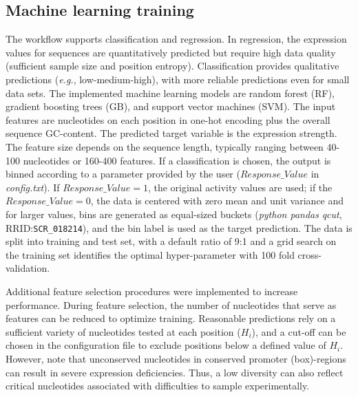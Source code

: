 \documentclass[utf8]{frontiersSCNS} %
\begin{document}
\subsection{Machine learning training} 
The workflow supports classification and regression. In regression, the expression values for sequences are quantitatively predicted but require high data quality (sufficient sample size and position entropy). Classification provides qualitative predictions (\textit{e.g.}, low-medium-high), with more reliable predictions even for small data sets. The implemented machine learning models are random forest (RF), gradient boosting trees (GB), and support vector machines (SVM). The input features are nucleotides on each position in one-hot encoding plus the overall sequence GC-content. The predicted target variable is the expression strength. The feature size depends on the sequence length, typically ranging between 40-100 nucleotides or 160-400 features. If a classification is chosen, the output is binned according to a parameter provided by the user ($Response\_Value$ in \textit{config.txt}). If $Response\_Value=1$, the original activity values are used; if the $Response\_Value=0$, the data is centered with zero mean and unit variance and for larger values, bins are generated as equal-sized buckets (\textit{python pandas} \textit{qcut}, RRID:\verb:SCR_018214:), and the bin label is used as the target prediction. The data is split into training and test set, with a default ratio of 9:1 and a grid search on the training set identifies the optimal hyper-parameter with 100 fold cross-validation.

Additional feature selection procedures were implemented to increase performance. During feature selection, the number of nucleotides that serve as features can be reduced to optimize training. Reasonable predictions rely on a sufficient variety of nucleotides tested at each position ($H_i$), and a cut-off can be chosen in the configuration file to exclude positions below a defined value of $H_i$. However, note that unconserved nucleotides in conserved promoter (box)-regions can result in severe expression deficiencies. Thus, a low diversity can also reflect critical nucleotides associated with difficulties to sample experimentally.   
\end{document}
